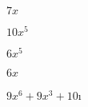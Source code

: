 \documentclass{article}
\begin{document}
\begin{multicols}{2}
\item $7x$\item $10x^{5}$\item $6x^{5}$\item $6x$\item $9x^{6}+9x^{3}+10$\i
\end{multicols}
\end{document}
